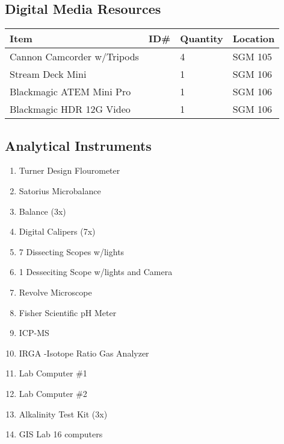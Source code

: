 \documentclass[12pt]{../SOP4_alpha}\usepackage[]{graphicx}\usepackage[]{color}
\begin{document}
\subsection{Digital Media Resources}
\begin{tabular}{|l|l|l|l|}
\hline
Item      & ID\#  & Quantity & Location \\ \hline
Cannon Camcorder w/Tripods   && 4 & SGM 105 \\
Stream Deck Mini && 1 & SGM 106 \\
Blackmagic ATEM Mini Pro && 1 & SGM 106\\
Blackmagic HDR 12G Video && 1 & SGM 106\\
\hline
\end{tabular}

\subsection{Analytical Instruments}
\begin{enumerate}
  \item Turner Design Flourometer
  \item Satorius Microbalance
  \item Balance (3x)
  \item Digital Calipers (7x)
  \item 7 Dissecting Scopes w/lights
  \item 1 Desseciting Scope w/lights and Camera
  \item Revolve Microscope
  \item Fisher Scientific pH Meter
  \item ICP-MS
  \item IRGA  -Isotope Ratio Gas Analyzer
  \item Lab Computer \#1
  \item Lab Computer \#2
  \item Alkalinity Test Kit (3x)
  \item GIS Lab 16 computers
\end{enumerate}
\end{document}
